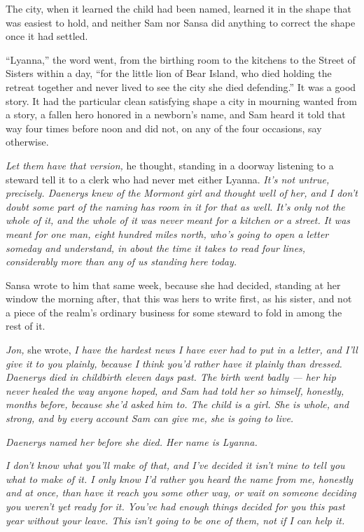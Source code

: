 The city, when it learned the child had been named, learned it in the shape that was easiest to hold, and neither Sam nor Sansa did anything to correct the shape once it had settled.

“Lyanna,” the word went, from the birthing room to the kitchens to the Street of Sisters within a day, “for the little lion of Bear Island, who died holding the retreat together and never lived to see the city she died defending.” It was a good story. It had the particular clean satisfying shape a city in mourning wanted from a story, a fallen hero honored in a newborn’s name, and Sam heard it told that way four times before noon and did not, on any of the four occasions, say otherwise.

\textit{Let them have that version,} he thought, standing in a doorway listening to a steward tell it to a clerk who had never met either Lyanna. \textit{It’s not untrue, precisely. Daenerys knew of the Mormont girl and thought well of her, and I don’t doubt some part of the naming has room in it for that as well. It’s only not the whole of it, and the whole of it was never meant for a kitchen or a street. It was meant for one man, eight hundred miles north, who’s going to open a letter someday and understand, in about the time it takes to read four lines, considerably more than any of us standing here today.}

\sceneBreak

Sansa wrote to him that same week, because she had decided, standing at her window the morning after, that this was hers to write first, as his sister, and not a piece of the realm’s ordinary business for some steward to fold in among the rest of it.

\textit{Jon,} she wrote, \textit{I have the hardest news I have ever had to put in a letter, and I’ll give it to you plainly, because I think you’d rather have it plainly than dressed. Daenerys died in childbirth eleven days past. The birth went badly — her hip never healed the way anyone hoped, and Sam had told her so himself, honestly, months before, because she’d asked him to. The child is a girl. She is whole, and strong, and by every account Sam can give me, she is going to live.}

\textit{Daenerys named her before she died. Her name is Lyanna.}

\textit{I don’t know what you’ll make of that, and I’ve decided it isn’t mine to tell you what to make of it. I only know I’d rather you heard the name from me, honestly and at once, than have it reach you some other way, or wait on someone deciding you weren’t yet ready for it. You’ve had enough things decided for you this past year without your leave. This isn’t going to be one of them, not if I can help it.}

